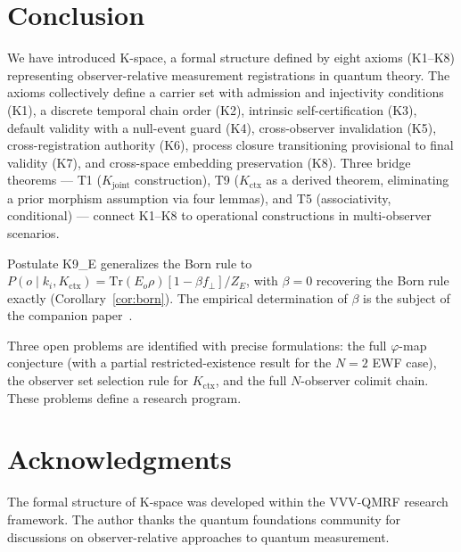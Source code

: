 \documentclass[12pt,a4paper]{article}
\theoremstyle{plain}
\theoremstyle{definition}
\theoremstyle{remark}
\newcommand{\Kjoint}{K_{\mathrm{joint}}}
\newcommand{\Kctx}{K_{\mathrm{ctx}}}
\newcommand{\fperp}{f_{\!\perp}}
\begin{document}
\section{Conclusion}
\label{sec:conclusion}

We have introduced K-space, a formal structure defined by eight axioms
(K1--K8) representing observer-relative measurement registrations in
quantum theory. The axioms collectively define a carrier set with
admission and injectivity conditions (K1), a discrete temporal chain
order (K2), intrinsic self-certification (K3), default validity with a
null-event guard (K4), cross-observer invalidation (K5), cross-registration
authority (K6), process closure transitioning provisional to final validity
(K7), and cross-space embedding preservation (K8). Three bridge theorems
--- T1 ($\Kjoint$ construction), T9 ($\Kctx$ as a derived theorem,
eliminating a prior morphism assumption via four lemmas), and T5
(associativity, conditional) --- connect K1--K8 to operational constructions
in multi-observer scenarios.

Postulate K9\_E generalizes the Born rule to
$P(o\mid k_i,\Kctx) = \mathrm{Tr}(E_o\rho)[1-\beta\fperp]/Z_E$,
with $\beta=0$ recovering the Born rule exactly (Corollary~\ref{cor:born}).
The empirical determination of $\beta$ is the subject of the companion
paper~\cite{K9S12_Zenodo}.

Three open problems are identified with precise formulations: the full
$\varphi$-map conjecture (with a partial restricted-existence result for the
$N=2$ EWF case), the observer set selection rule for $\Kctx$, and the full
$N$-observer colimit chain. These problems define a research program.

\section*{Acknowledgments}

The formal structure of K-space was developed within the VVV-QMRF
research framework. The author thanks the quantum foundations community
for discussions on observer-relative approaches to quantum measurement.
\end{document}
